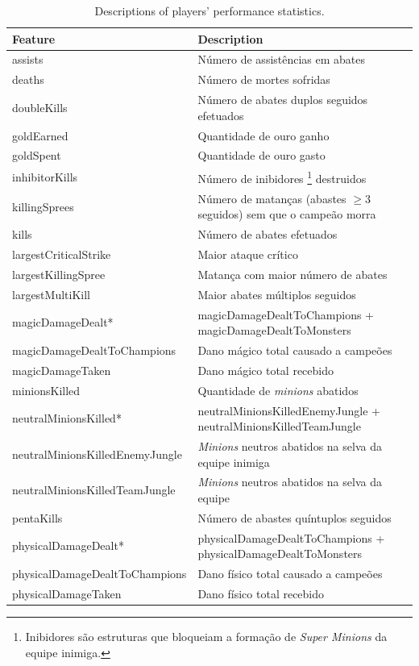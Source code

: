 \begin{table}
  \scriptsize
  \caption{Descriptions of players' performance statistics.}
  \label{tab:features-desc}
  \begin{tabular}{p{}p{}}
    \toprule
    Feature & Description \\
    \midrule
assists & Número de assistências em abates\\
deaths & Número de mortes sofridas \\
doubleKills & Número de abates duplos seguidos efetuados\\
goldEarned & Quantidade de ouro ganho\\
goldSpent & Quantidade de ouro gasto\\
inhibitorKills & Número de inibidores \footnote{Inibidores são estruturas que bloqueiam a formação de \textit{Super Minions} da equipe inimiga.} destruidos\\
killingSprees & Número de matanças (abastes $\geq 3$ seguidos) sem que o campeão morra \\
kills & Número de abates efetuados\\
largestCriticalStrike & Maior ataque crítico\\
largestKillingSpree & Matança com maior número de abates\\
largestMultiKill & Maior abates múltiplos seguidos\\
magicDamageDealt* & magicDamageDealtToChampions +  magicDamageDealtToMonsters\\
magicDamageDealtToChampions & Dano mágico total causado a campeões\\
magicDamageTaken & Dano mágico total recebido\\
minionsKilled & Quantidade de \textit{minions} abatidos\\
 neutralMinionsKilled* & neutralMinionsKilledEnemyJungle + neutralMinionsKilledTeamJungle\\
neutralMinionsKilledEnemyJungle & \textit{Minions} neutros abatidos na selva da equipe inimiga
\\
neutralMinionsKilledTeamJungle & \textit{Minions} neutros abatidos na selva da equipe\\
pentaKills & Número de abastes quíntuplos seguidos\\
physicalDamageDealt* & physicalDamageDealtToChampions + physicalDamageDealtToMonsters\\
physicalDamageDealtToChampions & Dano físico total causado a campeões\\
physicalDamageTaken & Dano físico total recebido\\

\end{tabular}
\end{table}
